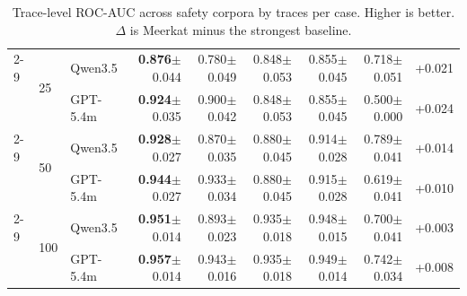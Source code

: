 \documentclass{article} %
\newcommand{\res}[2]{#1{\scriptsize$\pm$#2}}
\newcommand{\bestres}[2]{\textbf{#1}{\scriptsize$\pm$#2}}
\begin{document}
\begin{table}[t]
\begin{tabular}{@{}lllrrrrrr@{}}
    \cmidrule(lr){2-9}
     & \multirow{2}{*}{25} & Qwen3.5 & \bestres{0.876}{0.044} & \res{0.780}{0.049} & \res{0.848}{0.053} & \res{0.855}{0.045} & \res{0.718}{0.051} & +0.021 \\
     & & GPT-5.4m & \bestres{0.924}{0.035} & \res{0.900}{0.042} & \res{0.848}{0.053} & \res{0.855}{0.045} & \res{0.500}{0.000} & +0.024 \\
    \cmidrule(lr){2-9}
     & \multirow{2}{*}{50} & Qwen3.5 & \bestres{0.928}{0.027} & \res{0.870}{0.035} & \res{0.880}{0.045} & \res{0.914}{0.028} & \res{0.789}{0.041} & +0.014 \\
     & & GPT-5.4m & \bestres{0.944}{0.027} & \res{0.933}{0.034} & \res{0.880}{0.045} & \res{0.915}{0.028} & \res{0.619}{0.041} & +0.010 \\
    \cmidrule(lr){2-9}
     & \multirow{2}{*}{100} & Qwen3.5 & \bestres{0.951}{0.014} & \res{0.893}{0.023} & \res{0.935}{0.018} & \res{0.948}{0.015} & \res{0.700}{0.041} & +0.003 \\
     & & GPT-5.4m & \bestres{0.957}{0.014} & \res{0.943}{0.016} & \res{0.935}{0.018} & \res{0.949}{0.014} & \res{0.742}{0.034} & +0.008 \\
    \bottomrule
  \end{tabular}
  \caption{Trace-level ROC-AUC across safety corpora by traces per case. Higher is better. $\Delta$ is Meerkat minus the strongest baseline.}
  \label{tab:reward-rocauc}
\end{table}
\end{document}
